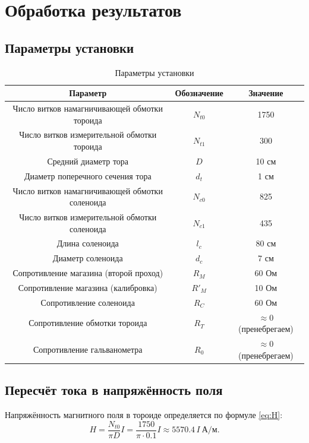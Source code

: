 \documentclass[a4paper]{article}
\begin{document}
\section{Обработка результатов}

\subsection{Параметры установки}

\begin{table}[h]
	\centering
	\caption{Параметры установки}
	\label{tab:params}
	\begin{tabular}{|c|c|c|}
		\hline
		Параметр & Обозначение & Значение \\
		\hline
		Число витков намагничивающей обмотки тороида & $N_{t0}$ & 1750 \\
		\hline
		Число витков измерительной обмотки тороида & $N_{t1}$ & 300 \\
		\hline
		Средний диаметр тора & $D$ & 10 см \\
		\hline
		Диаметр поперечного сечения тора & $d_t$ & 1 см \\
		\hline
		Число витков намагничивающей обмотки соленоида & $N_{c0}$ & 825 \\
		\hline
		Число витков измерительной обмотки соленоида & $N_{c1}$ & 435 \\
		\hline
		Длина соленоида & $l_c$ & 80 см \\
		\hline
		Диаметр соленоида & $d_c$ & 7 см \\
		\hline
		Сопротивление магазина (второй проход) & $R_M$ & 60 Ом \\
		\hline
		Сопротивление магазина (калибровка) & $R'_M$ & 10 Ом \\
		\hline
		Сопротивление соленоида & $R_C$ & 60 Ом \\
		\hline
		Сопротивление обмотки тороида & $R_T$ & $\approx 0$ (пренебрегаем) \\
		\hline
		Сопротивление гальванометра & $R_0$ & $\approx 0$ (пренебрегаем) \\
		\hline
	\end{tabular}
\end{table}

\subsection{Пересчёт тока в напряжённость поля}

Напряжённость магнитного поля в тороиде определяется по формуле \eqref{eq:H}:
\[
H = \frac{N_{t0}}{\pi D} I = \frac{1750}{\pi \cdot 0.1} I \approx 5570.4 \, I \ \text{А/м}.
\]
\end{document}
